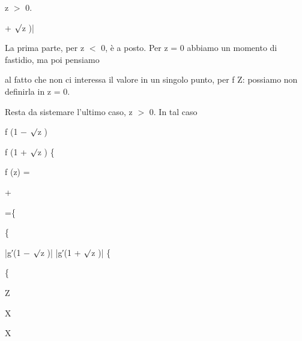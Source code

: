 \documentclass[a4paper,portrait,12pt]{article}
\begin{document}
\begin{flushleft}
z $>$ 0.
\end{flushleft}


\begin{flushleft}
+ $\surd$z )|
\end{flushleft}





\begin{flushleft}
La prima parte, per z $<$ 0, \`{e} a posto. Per z = 0 abbiamo un momento di fastidio, ma poi pensiamo
\end{flushleft}


\begin{flushleft}
al fatto che non ci interessa il valore in un singolo punto, per f Z: possiamo non definirla in z = 0.
\end{flushleft}


\begin{flushleft}
Resta da sistemare l'ultimo caso, z $>$ 0. In tal caso
\end{flushleft}


\begin{flushleft}
f (1 $-$ $\surd$z )
\end{flushleft}


\begin{flushleft}
f (1 + $\surd$z ) \{
\end{flushleft}


\begin{flushleft}
f (z) =
\end{flushleft}


+


=\{


\{


\begin{flushleft}
|g′(1 $-$ $\surd$z )| |g′(1 + $\surd$z )| \{
\end{flushleft}


\{


\begin{flushleft}
Z
\end{flushleft}





\begin{flushleft}
X
\end{flushleft}





\begin{flushleft}
X
\end{flushleft}
\end{document}
